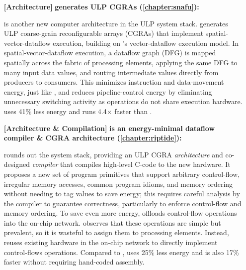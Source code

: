 \begin{itemize}
\item[\textbf{[Architecture]}]
\textbf{\snafu generates ULP CGRAs (\autoref{chapter:snafu}): }

\snafu is another new computer architecture in the ULP system stack.
% 
\snafu generates ULP coarse-grain reconfigurable arrays (CGRAs) that implement spatial-vector-dataflow execution, building on \manic's vector-dataflow execution model.
% 
% 
In spatial-vector-dataflow execution, a dataflow graph (DFG) is mapped spatially across the fabric of processing elements, applying the same DFG to many input data values, and routing intermediate values directly from producers to consumers.
% 
This minimizes instruction and data-movement energy, just like \manic, and reduces pipeline-control energy by eliminating unnecessary switching activity as operations do not share execution hardware.
% 
\snafu uses 41$\%$ less energy and runs 4.4$\times$ faster than \manic.
% 

\item[\textbf{[Architecture \& Compilation]}]
\textbf{\riptide is an energy-minimal dataflow compiler \& CGRA architecture (\autoref{chapter:riptide}): }

\riptide rounds out the system stack, providing an ULP CGRA \emph{architecture} and co-designed \emph{compiler} that compiles high-level C-code to the new hardware.
% 
It proposes a new set of program primitives that support arbitrary control-flow, irregular memory accesses, common program idioms, and memory ordering without needing to tag values to save energy; this requires careful analysis by the compiler to guarantee correctness, particularly to enforce control-flow and memory ordering.
% 
To save even more energy, \riptide offloads control-flow operations into the on-chip network.
% 
\riptide observes that these operations are simple but prevalent, so it is wasteful to assign them to processing elements.
% 
Instead, \riptide reuses existing hardware in the on-chip network to directly implement control-flows operations.
% 
Compared to \snafu, \riptide uses 25\% less energy and is also 17\% faster without requiring hand-coded assembly.
% 

\end{itemize}

